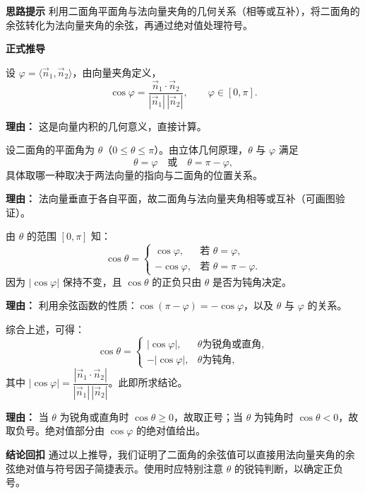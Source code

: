 \begin{proofbox}
	\textbf{\textcolor{CProof}{思路提示}}
	利用二面角平面角与法向量夹角的几何关系（相等或互补），将二面角的余弦转化为法向量夹角的余弦，再通过绝对值处理符号。

	\medskip
	\textbf{\textcolor{CProof}{正式推导}}
	\begin{description}[style=nextline, leftmargin=2.8em, labelsep=0.5em, itemsep=0.55em]
		\item[\textbf{步骤一（向量夹角）：}]
			设 $\varphi = \langle\vec{n}_1,\vec{n}_2\rangle$，由向量夹角定义，
			\[
				\cos\varphi = \frac{\vec{n}_1\cdot\vec{n}_2}{|\vec{n}_1|\,|\vec{n}_2|},
				\qquad
				\varphi\in[0,\pi].
			\]
			\par\textbf{理由：} 这是向量内积的几何意义，直接计算。
		\item[\textbf{步骤二（几何关系）：}]
			设二面角的平面角为 $\theta$（$0\le\theta\le\pi$）。由立体几何原理，$\theta$ 与 $\varphi$ 满足
			\[
				\theta = \varphi \quad\text{或}\quad \theta = \pi-\varphi,
			\]
			具体取哪一种取决于两法向量的指向与二面角的位置关系。
			\par\textbf{理由：} 法向量垂直于各自平面，故二面角与法向量夹角相等或互补（可画图验证）。
		\item[\textbf{步骤三（符号分析）：}]
			由 $\theta$ 的范围 $[0,\pi]$ 知：
			\[
				\cos\theta =
				\begin{cases}
					\cos\varphi, & \text{若 } \theta = \varphi,\\ -\cos\varphi, & \text{若 } \theta = \pi-\varphi.
			\end{cases}
			\]
			因为 $|\cos\varphi|$ 保持不变，且 $\cos\theta$ 的正负只由 $\theta$ 是否为钝角决定。
			\par\textbf{理由：} 利用余弦函数的性质：$\cos(\pi-\varphi)=-\cos\varphi$，以及 $\theta$ 与 $\varphi$ 的关系。
		\item[\textbf{步骤四（分段归纳）：}]
			综合上述，可得：
			\[
				\cos\theta =
				\begin{cases}
					\bigl|\cos\varphi\bigr|, & \theta\text{为锐角或直角},\\ -\bigl|\cos\varphi\bigr|, & \theta\text{为钝角},
			\end{cases}
			\]
			其中 $\bigl|\cos\varphi\bigr| = \dfrac{|\vec{n}_1\cdot\vec{n}_2|}{|\vec{n}_1|\,|\vec{n}_2|}$。此即所求结论。
			\par\textbf{理由：} 当 $\theta$ 为锐角或直角时 $\cos\theta\ge0$，故取正号；当 $\theta$ 为钝角时 $\cos\theta<0$，故取负号。绝对值部分由 $\cos\varphi$ 的绝对值给出。
	\end{description}

	\medskip
	\textbf{\textcolor{CProof}{结论回扣}}
	通过以上推导，我们证明了二面角的余弦值可以直接用法向量夹角的余弦绝对值与符号因子简捷表示。使用时应特别注意 $\theta$ 的锐钝判断，以确定正负号。
\end{proofbox}
